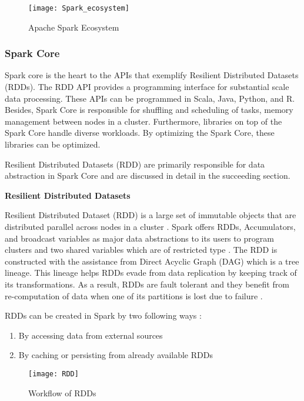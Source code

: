 \begin{figure}[htbp]
	\centering
		\texttt{[image: Spark\_ecosystem]}
	\caption{Apache Spark Ecosystem \cite{spark:website}}
	\label{fig:ecosystem}
\end{figure}


\subsubsection{Spark Core}
\label{Spark Core}
Spark core is the heart to the APIs that exemplify Resilient Distributed Datasets (RDDs). The RDD API provides a programming interface for substantial scale data processing. These APIs can be programmed in Scala, Java, Python, and R. Besides, Spark Core is responsible for shuffling and scheduling of tasks, memory management between nodes in a cluster. Furthermore, libraries on top of the Spark Core handle diverse workloads. By optimizing the Spark Core, these libraries can be optimized.

\par  Resilient Distributed Datasets (RDD) are primarily responsible for data abstraction in Spark Core and are discussed in detail in the succeeding section. 

\textbf{Resilient Distributed Datasets}
\par Resilient Distributed Dataset (RDD) is a large set of immutable objects that are distributed parallel across nodes in a cluster \cite{Zaharia2012}. Spark offers RDDs, Accumulators, and broadcast variables as major data abstractions to its users to program clusters and two shared variables which are of restricted type \cite{zaharia2010spark}. The RDD is constructed with the assistance from Direct Acyclic Graph (DAG) which is a tree lineage. This lineage helps RDDs evade from data replication by keeping track of its transformations. As a result, RDDs are fault tolerant and they benefit from re-computation of data when one of its partitions is lost due to failure \cite{salloum2016big}.

\par RDDs can be created in Spark by two following ways \cite{karau2015learning,spark:website}:
\begin{enumerate}
\item By accessing data from external sources
\item By caching or persisting from already available RDDs
\end{enumerate}


\begin{figure}[htbp]
	\centering
		\texttt{[image: RDD]}
	\caption{Workflow of RDDs}
	\label{fig:RDDs workflow}
\end{figure}

